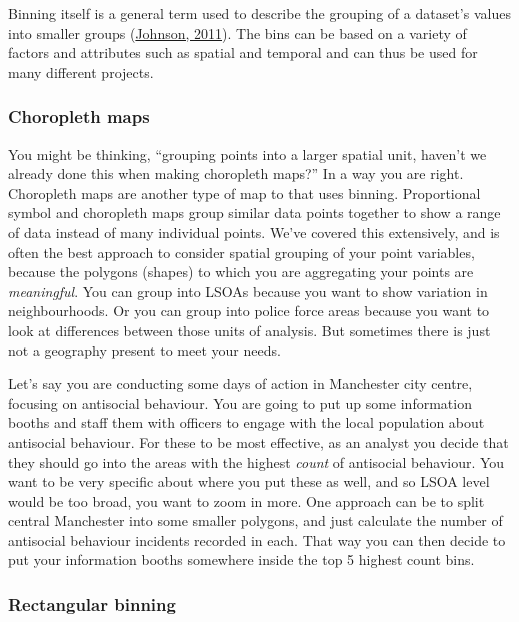 \documentclass[
]{book}
\begin{document}
Binning itself is a general term used to describe the grouping of a dataset's values into smaller groups (\href{http://indiemaps.com/blog/2011/10/hexbins/}{Johnson, 2011}). The bins can be based on a variety of factors and attributes such as spatial and temporal and can thus be used for many different projects.

\hypertarget{choropleth-maps-1}{%
\subsubsection{Choropleth maps}\label{choropleth-maps-1}}

You might be thinking, ``grouping points into a larger spatial unit, haven't we already done this when making choropleth maps?'' In a way you are right. Choropleth maps are another type of map to that uses binning. Proportional symbol and choropleth maps group similar data points together to show a range of data instead of many individual points. We've covered this extensively, and is often the best approach to consider spatial grouping of your point variables, because the polygons (shapes) to which you are aggregating your points are \emph{meaningful}. You can group into LSOAs because you want to show variation in neighbourhoods. Or you can group into police force areas because you want to look at differences between those units of analysis. But sometimes there is just not a geography present to meet your needs.

Let's say you are conducting some days of action in Manchester city centre, focusing on antisocial behaviour. You are going to put up some information booths and staff them with officers to engage with the local population about antisocial behaviour. For these to be most effective, as an analyst you decide that they should go into the areas with the highest \emph{count} of antisocial behaviour. You want to be very specific about where you put these as well, and so LSOA level would be too broad, you want to zoom in more. One approach can be to split central Manchester into some smaller polygons, and just calculate the number of antisocial behaviour incidents recorded in each. That way you can then decide to put your information booths somewhere inside the top 5 highest count bins.

\hypertarget{rectangular-binning}{%
\subsubsection{Rectangular binning}\label{rectangular-binning}}
\end{document}
